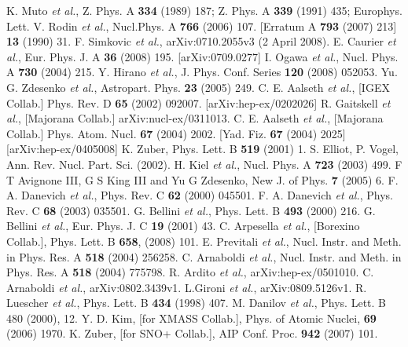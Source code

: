 \begin{thebibliography}{99}
 K. Muto \textit{et al.}, Z. Phys. A \textbf{334}   (1989) 187; Z. Phys. A \textbf{339} (1991) 435; Europhys. Lett.   V. Rodin \textit{et al.}, Nucl.Phys. A \textbf{766}  
(2006) 107. [Erratum A \textbf{793} (2007) 213]
\textbf{13} (1990) 31.
F. Simkovic \textit{et al.}, arXiv:0710.2055v3 (2 April   2008).
E. Caurier \textit{et al.}, Eur. Phys. J. A \textbf{36}
  (2008) 195. [arXiv:0709.0277]
 I. Ogawa \textit{et al.}, Nucl. Phys. A \textbf{730}   (2004) 215.
Y. Hirano \textit{et al.}, J. Phys. Conf. Series \textbf{120} (2008) 052053.
 Yu. G. Zdesenko \textit{et al.}, Astropart. Phys. \textbf{23} (2005) 249.
C. E. Aalseth \textit{et al.}, [IGEX Collab.] Phys. Rev. D \textbf{65} (2002) 092007. [arXiv:hep-ex/0202026]
 R. Gaitskell \textit{et al.}, [Majorana Collab.] arXiv:nucl-ex/0311013.
C. E. Aalseth \textit{et al.}, [Majorana Collab.] Phys. Atom. Nucl. \textbf{67} (2004) 2002. [Yad. Fiz. \textbf{67} (2004) 2025] [arXiv:hep-ex/0405008]
 K. Zuber, Phys. Lett. B \textbf{519} (2001) 1.
 S. Elliot, P. Vogel, Ann. Rev. Nucl. Part. Sci.   (2002).
 H. Kiel \textit{et al.}, Nucl. Phys. A \textbf{723} (2003) 499.
F T Avignone III, G S King III and Yu G Zdesenko, New J. of Phys. \textbf{7} (2005) 6.
F. A. Danevich \textit{et al.}, Phys. Rev. C \textbf{62} (2000) 045501.
F. A. Danevich \textit{et al.}, Phys. Rev. C \textbf{68} (2003) 035501.
G. Bellini \textit{et al.}, Phys. Lett. B \textbf{493} (2000) 216.
G. Bellini \textit{et al.}, Eur. Phys. J. C \textbf{19} (2001) 43.
C. Arpesella \textit{et al.}, [Borexino Collab.], Phys.   Lett. B \textbf{658}, (2008) 101.
E. Previtali \textit{et al.}, Nucl. Instr. and Meth. in
Phys. Res. A \textbf{518} (2004) 256258.
C. Arnaboldi \textit{et al.}, Nucl. Instr. and Meth. in
Phys. Res. A \textbf{518} (2004) 775798.
R. Ardito \textit{et al.}, arXiv:hep-ex/0501010.
C. Arnaboldi \textit{et al.}, arXiv:0802.3439v1.
L.Gironi \textit{et al.}, arXiv:0809.5126v1.
R. Luescher \textit{et al.}, Phys. Lett. B \textbf{434} (1998) 407.
M. Danilov \textit{et al.}, Phys. Lett. B 480 (2000), 12.
Y. D. Kim, [for XMASS Collab.], 	Phys. of Atomic Nuclei, \textbf{69} (2006) 1970.
K. Zuber, [for SNO+ Collab.], AIP Conf. Proc. \textbf{942} (2007) 101.

\end{thebibliography}

